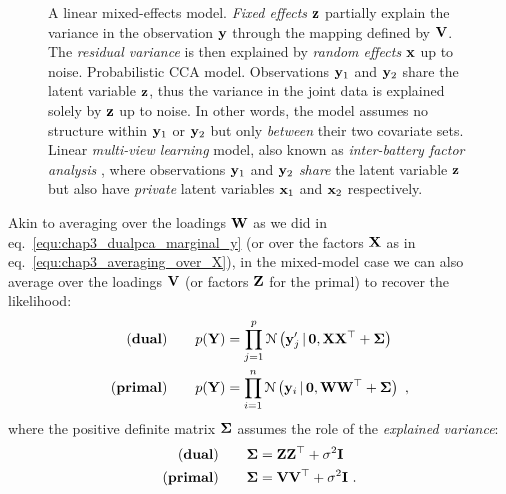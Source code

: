       \begin{figure}[!htbp]
	\centering
	\caption[Graphical linear models of mixed-effects, CCA and multi-view.] {
	  \textbf{} A linear mixed-effects model. \emph{ Fixed effects} $\mathbf{z}$ partially explain the variance in the observation $\mathbf{y}$ through the mapping defined by $\mathbf{V}$. The \emph{residual variance} is then explained by \emph{random effects} $\mathbf{x}$ up to noise. \textbf{} Probabilistic CCA model. Observations $\mathbf{y}_1$ and $\mathbf{y}_2$ share the latent variable $\mathbf{z}$, thus the variance in the joint data is explained solely by $\mathbf{z}$ up to noise. In other words, the model assumes no structure within $\mathbf{y}_1$ or $\mathbf{y}_2$ but only \emph{between} their two covariate sets. \textbf{} Linear \textit{multi-view learning} model, also known as \textit{inter-battery factor analysis} \citep[IBFA,][]{Tucker:interbattery58, Klami:generative06, Ek:ambiguity08} , where observations $\mathbf{y}_1$ and $\mathbf{y}_2$ \emph{share} the latent variable $\mathbf{z}$ but also have \emph{private} latent variables $\mathbf{x}_1$ and $\mathbf{x}_2$ respectively.}
      \end{figure}
      
      Akin to averaging over the loadings $\mathbf{W}$ as we did in eq.~\eqref{equ:chap3_dualpca_marginal_y} (or over the factors $\mathbf{X}$ as in eq.~\eqref{equ:chap3_averaging_over_X}), in the mixed-model case we can also average over the loadings $\mathbf{V}$ (or factors $\mathbf{Z}$ for the primal) to recover the likelihood:
      \begin{equation}  \label{equ:chap3_marginalY}
	\begin{split}
	  \textrm{(\textbf{dual})} \qquad p(\mathbf{Y}) &= \prod_{j=1}^p \mathcal{N} \left(  \mathbf{y}^{\prime}_j \,|\, \mathbf{0} ,  \mathbf{X}\mathbf{X}^\top + \mathbf{\Sigma} \right) \\
	  \textrm{(\textbf{primal})} \qquad p(\mathbf{Y}) &= \prod_{i=1}^n \mathcal{N} \left(  \mathbf{y}_i \,|\, \mathbf{0} ,  \mathbf{W}\mathbf{W}^\top + \mathbf{\Sigma} \right) ~,
	\end{split}
      \end{equation}
      where the positive definite matrix $\mathbf{\Sigma}$ assumes the role of the \emph{explained variance}:
      \[
	\begin{split}
	  \textrm{(\textbf{dual})} \qquad &\mathbf{\Sigma} = \mathbf{Z}\mathbf{Z}^\top + \sigma^2\mathbf{I} \\
	  \textrm{(\textbf{primal})} \qquad &\mathbf{\Sigma} = \mathbf{V}\mathbf{V}^\top + \sigma^2\mathbf{I} ~.
	\end{split}
      \]


